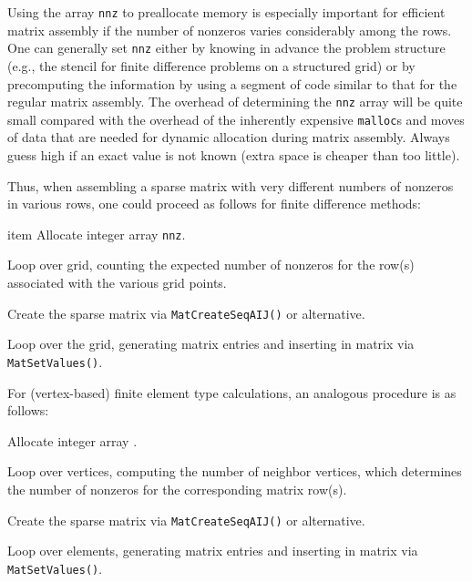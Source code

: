 Using the array \lstinline{nnz} to preallocate memory is especially
important for efficient matrix assembly if the number of nonzeros
varies considerably among the rows.  One can generally set \lstinline{nnz}
either by knowing in advance the problem structure (e.g., the stencil
for finite difference problems on a structured grid) or by
precomputing the information by using a segment of code similar to
that for the regular matrix assembly.  The overhead of determining the
\lstinline{nnz} array will be quite small compared with the overhead of the
inherently expensive \lstinline{malloc}s and moves of data that are needed for
dynamic allocation during matrix assembly. Always guess high if an exact
value is not known (extra space is cheaper than too little).

Thus, when assembling a sparse matrix with very different
numbers of nonzeros in various rows, one could proceed
as follows for finite difference methods:
\begin{tightenumerate}
\item item Allocate integer array \lstinline{nnz}.
\item Loop over grid, counting the expected number of nonzeros for the row(s)
associated with the various grid points.
\item Create the sparse matrix via \lstinline{MatCreateSeqAIJ()} or alternative.
\item Loop over the grid, generating matrix entries and inserting
    in matrix via \lstinline{MatSetValues()}.
\end{tightenumerate}
For (vertex-based) finite element type calculations, an analogous procedure is as follows:
\begin{tightenumerate}
\item Allocate integer array .
\item Loop over vertices, computing the number of neighbor vertices, which determines the
 number of nonzeros for the corresponding matrix row(s).
\item Create the sparse matrix via \lstinline{MatCreateSeqAIJ()} or alternative.
\item Loop over elements, generating matrix entries and inserting
      in matrix via \lstinline{MatSetValues()}.
\end{tightenumerate}

